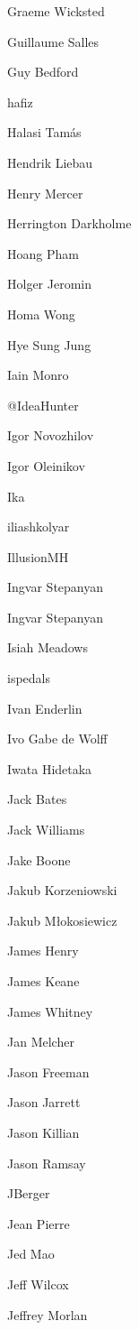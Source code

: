 \begin{DoxyItemize}
\item Graeme Wicksted
\item Guillaume Salles
\item Guy Bedford
\item hafiz
\item Halasi Tamás
\item Hendrik Liebau
\item Henry Mercer
\item Herrington Darkholme
\item Hoang Pham
\item Holger Jeromin
\item Homa Wong
\item Hye Sung Jung
\item Iain Monro
\item @\+Idea\+Hunter
\item Igor Novozhilov
\item Igor Oleinikov
\item Ika
\item iliashkolyar
\item Illusion\+MH
\item Ingvar Stepanyan
\item Ingvar Stepanyan
\item Isiah Meadows
\item ispedals
\item Ivan Enderlin
\item Ivo Gabe de Wolff
\item Iwata Hidetaka
\item Jack Bates
\item Jack Williams
\item Jake Boone
\item Jakub Korzeniowski
\item Jakub Młokosiewicz
\item James Henry
\item James Keane
\item James Whitney
\item Jan Melcher
\item Jason Freeman
\item Jason Jarrett
\item Jason Killian
\item Jason Ramsay
\item J\+Berger
\item Jean Pierre
\item Jed Mao
\item Jeff Wilcox
\item Jeffrey Morlan

\end{DoxyItemize}
